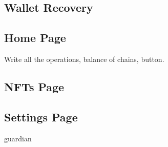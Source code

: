 \subsection{Wallet Recovery}
\label{subsec:wallet_recovery}

\subsection{Home Page}
\label{subsec:wallet_home_page}

Write all the operations, balance of chains, button.

\subsection{NFTs Page}
\label{subsec:nfts_page}

\subsection{Settings Page}
\label{subsec:settings_page}

guardian
